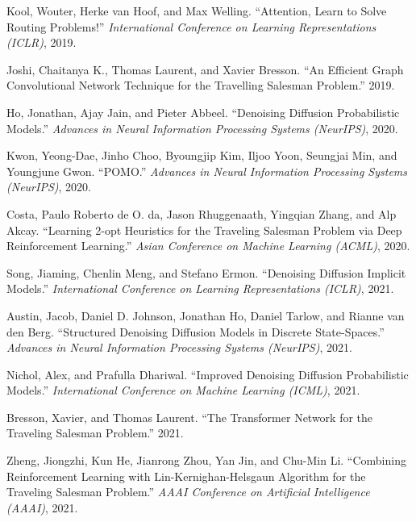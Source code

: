 \label{sec:rationale}

\begin{thebibliography}{}

Kool, Wouter, Herke van Hoof, and Max Welling. ``Attention, Learn to Solve Routing Problems!'' \textit{International Conference on Learning Representations (ICLR)}, 2019.

Joshi, Chaitanya K., Thomas Laurent, and Xavier Bresson. ``An Efficient Graph Convolutional Network Technique for the Travelling Salesman Problem.'' 2019.

Ho, Jonathan, Ajay Jain, and Pieter Abbeel. ``Denoising Diffusion Probabilistic Models.'' \textit{Advances in Neural Information Processing Systems (NeurIPS)}, 2020.

Kwon, Yeong-Dae, Jinho Choo, Byoungjip Kim, Iljoo Yoon, Seungjai Min, and Youngjune Gwon. ``POMO.'' \textit{Advances in Neural Information Processing Systems (NeurIPS)}, 2020.

Costa, Paulo Roberto de O. da, Jason Rhuggenaath, Yingqian Zhang, and Alp Akcay. ``Learning 2-opt Heuristics for the Traveling Salesman Problem via Deep Reinforcement Learning.'' \textit{Asian Conference on Machine Learning (ACML)}, 2020.

Song, Jiaming, Chenlin Meng, and Stefano Ermon. ``Denoising Diffusion Implicit Models.'' \textit{International Conference on Learning Representations (ICLR)}, 2021.

Austin, Jacob, Daniel D. Johnson, Jonathan Ho, Daniel Tarlow, and Rianne van den Berg. ``Structured Denoising Diffusion Models in Discrete State-Spaces.'' \textit{Advances in Neural Information Processing Systems (NeurIPS)}, 2021.

Nichol, Alex, and Prafulla Dhariwal. ``Improved Denoising Diffusion Probabilistic Models.'' \textit{International Conference on Machine Learning (ICML)}, 2021.

Bresson, Xavier, and Thomas Laurent. ``The Transformer Network for the Traveling Salesman Problem.'' 2021.

Zheng, Jiongzhi, Kun He, Jianrong Zhou, Yan Jin, and Chu-Min Li. ``Combining Reinforcement Learning with Lin-Kernighan-Helsgaun Algorithm for the Traveling Salesman Problem.'' \textit{AAAI Conference on Artificial Intelligence (AAAI)}, 2021.


\end{thebibliography}
